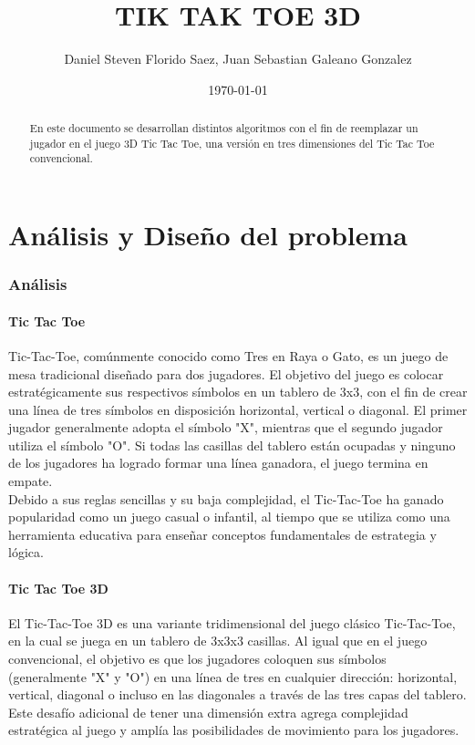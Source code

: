 \documentclass[oneside,spanish]{amsart}
\numberwithin{equation}{section}
\numberwithin{figure}{section}
\theoremstyle{definition}
\begin{document}
\title{TIK TAK TOE 3D}
\author{Daniel Steven Florido Saez, Juan Sebastian Galeano Gonzalez}
\date{\today}
\begin{abstract}
En este documento se desarrollan distintos algoritmos con el fin de reemplazar un jugador en el juego 3D Tic Tac Toe, una versión en tres dimensiones del Tic Tac Toe convencional. 
\end{abstract}

\maketitle

\part{Análisis y Diseño del problema}

\section{Análisis}

\subsection{Tic Tac Toe}

Tic-Tac-Toe, comúnmente conocido como Tres en Raya o Gato, es un juego de mesa tradicional diseñado para dos jugadores. El objetivo del juego es colocar estratégicamente sus respectivos símbolos en un tablero de 3x3, con el fin de crear una línea de tres símbolos en disposición horizontal, vertical o diagonal. El primer jugador generalmente adopta el símbolo "X", mientras que el segundo jugador utiliza el símbolo "O". Si todas las casillas del tablero están ocupadas y ninguno de los jugadores ha logrado formar una línea ganadora, el juego termina en empate.\\


Debido a sus reglas sencillas y su baja complejidad, el Tic-Tac-Toe ha ganado popularidad como un juego casual o infantil, al tiempo que se utiliza como una herramienta educativa para enseñar conceptos fundamentales de estrategia y lógica. \\

\subsection{Tic Tac Toe 3D}

El Tic-Tac-Toe 3D es una variante tridimensional del juego clásico Tic-Tac-Toe, en la cual se juega en un tablero de 3x3x3 casillas. Al igual que en el juego convencional, el objetivo es que los jugadores coloquen sus símbolos (generalmente "X" y "O") en una línea de tres en cualquier dirección: horizontal, vertical, diagonal o incluso en las diagonales a través de las tres capas del tablero. Este desafío adicional de tener una dimensión extra agrega complejidad estratégica al juego y amplía las posibilidades de movimiento para los jugadores. \\
\end{document}
